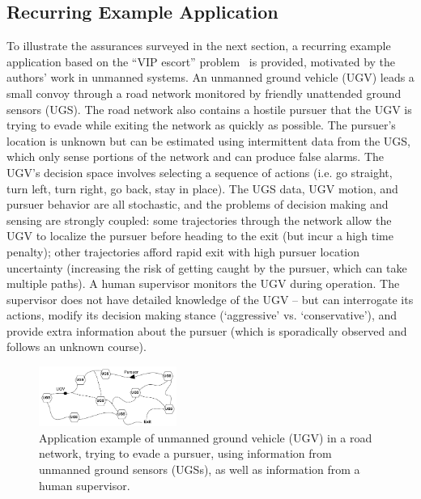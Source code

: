 \subsection{Recurring Example Application} \label{sec:mot_example}
    To illustrate the assurances surveyed in the next section, a recurring example application based on the ``VIP escort'' problem~\cite{Humphrey2012-lr} is provided, motivated by the authors' work in unmanned systems. 
    An unmanned ground vehicle (UGV) leads a small convoy through a road network monitored by friendly unattended ground sensors (UGS). The road network also contains a hostile pursuer that the UGV is trying to evade while exiting the network as quickly as possible. 
    The pursuer's location is unknown but can be estimated using intermittent data from the UGS, which only sense portions of the network and can produce false alarms. The UGV's decision space involves selecting a sequence of actions (i.e. go straight, turn left, turn right, go back, stay in place). The UGS data, UGV motion, and pursuer behavior are all stochastic, and the problems of decision making and sensing are strongly coupled: some trajectories through the network allow the UGV to localize the pursuer before heading to the exit (but incur a high time penalty); other trajectories afford rapid exit with high pursuer location uncertainty (increasing the risk of getting caught by the pursuer, which can take multiple paths). 
    A human supervisor monitors the UGV during operation. 
    The supervisor does not have detailed knowledge of the UGV -- but can interrogate its actions, modify its decision making stance (`aggressive' vs. `conservative'), and provide extra information about the pursuer (which is sporadically observed and follows an unknown course). 
    
	\begin{figure}[t]%
    	\centering
     	\includegraphics[width=0.4\textwidth]{Figures/RoadNet}
    	\caption{Application example of unmanned ground vehicle (UGV) in a road network, trying to evade a pursuer, using information from unmanned ground sensors (UGSs), as well as information from a human supervisor.} 
        \label{fig:RoadNet}
        \vspace{-0.2 in}
    \end{figure}


